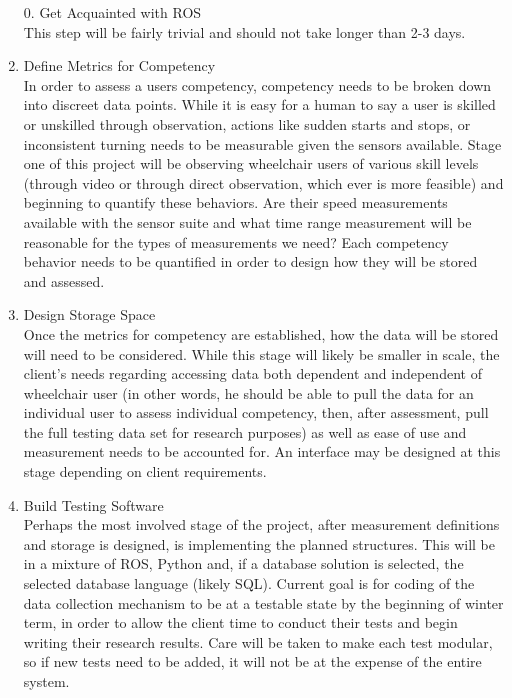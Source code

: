 \documentclass[letterpaper,10pt,titlepage]{article}
\begin{document}
\begin{enumerate}
\item [0.]\setcounter{enumi}{0} \large{Get Acquainted with ROS}\\
\normalsize This step will be fairly trivial and should not take longer than 2-3 days.
\item \large{Define Metrics for Competency}\\
\normalsize In order to assess a users competency, competency needs to be broken down into discreet data points. While it is easy for a human to say a user is skilled or unskilled through observation, actions like sudden starts and stops, or inconsistent turning needs to be measurable given the sensors available. Stage one of this project will be observing wheelchair users of various skill levels (through video or through direct observation, which ever is more feasible) and beginning to quantify these behaviors. Are their speed measurements available with the sensor suite and what time range measurement will be reasonable for the types of measurements we need? Each competency behavior needs to be quantified in order to design how they will be stored and assessed. 
\item \large{Design Storage Space}\\
\normalsize Once the metrics for competency are established, how the data will be stored will need to be considered. While this stage will likely be smaller in scale, the client's needs regarding accessing data both dependent and independent of wheelchair user (in other words, he should be able to pull the data for an individual user to assess individual competency, then, after assessment, pull the full testing data set for research purposes) as well as ease of use and measurement needs to be accounted for. An interface may be designed at this stage depending on client requirements. 
\item \large{Build Testing Software}\\
\normalsize Perhaps the most involved stage of the project, after measurement definitions and storage is designed, is implementing the planned structures. This will be in a mixture of ROS, Python and, if a database solution is selected, the selected database language (likely SQL). Current goal is for coding of the data collection mechanism to be at a testable state by the beginning of winter term, in order to allow the client time to conduct their tests and begin writing their research results. Care will be taken to make each test modular, so if new tests need to be added, it will not be at the expense of the entire system.

\end{enumerate}
\end{document}
